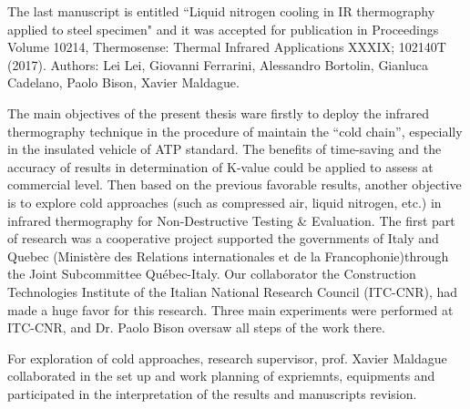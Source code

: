 The last manuscript is entitled ``Liquid nitrogen cooling in IR thermography applied to steel specimen" and it was accepted for publication in Proceedings Volume 10214, Thermosense: Thermal Infrared Applications XXXIX; 102140T (2017). Authors: Lei Lei, Giovanni Ferrarini, Alessandro Bortolin, Gianluca Cadelano, Paolo Bison, Xavier Maldague.

The main objectives of the present thesis ware firstly to deploy the infrared thermography technique in the procedure of maintain the ``cold chain'', especially in the insulated vehicle of ATP standard. The benefits of time-saving and the accuracy of results in determination of K-value could be applied to assess at commercial level. Then based on the previous favorable results, another objective is to explore cold approaches (such as compressed air, liquid nitrogen, etc.) in infrared thermography for Non-Destructive Testing \& Evaluation. The first part of research was a cooperative project supported the governments of Italy and Quebec (Ministère des Relations internationales et de la Francophonie)through the Joint Subcommittee Québec-Italy. Our collaborator the Construction Technologies Institute of the Italian National Research Council (ITC-CNR), had made a huge favor for this research. Three main experiments were performed at ITC-CNR, and Dr. Paolo Bison oversaw all steps of the work there.

For exploration of cold approaches, research supervisor, prof. Xavier Maldague collaborated in the set up and work planning of expriemnts, equipments and participated in the interpretation of the results and manuscripts revision.


